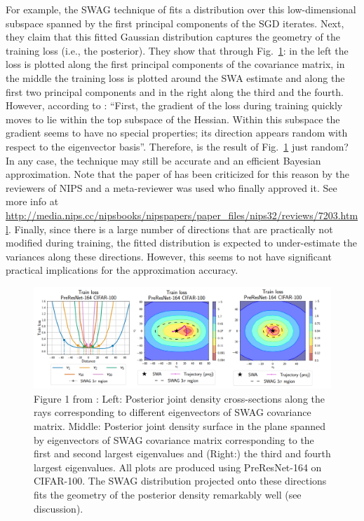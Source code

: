 For example, the SWAG technique of \textcite{maddox2019simple} fits a distribution over this low-dimensional subspace spanned by the first principal components of the SGD iterates.
Next, they claim that this fitted Gaussian distribution captures the geometry of the training loss (i.e., the posterior). 
They show that through Fig.~\ref{swaggeometry}: in the left the loss is plotted along the first principal components of the covariance matrix, in the middle the training loss is plotted around the SWA estimate and along the first two principal components and in the right along the third and the fourth. 
However, according to \textcite{gur-ari2018gradient}: ``First, the gradient of the loss during training quickly moves to lie within the top subspace of the Hessian. Within this subspace the gradient seems to have no special properties; its direction appears random with respect to the eigenvector basis''.
Therefore, is the result of Fig.~\ref{swaggeometry} just random?
In any case, the technique may still be accurate and an efficient Bayesian approximation. 
Note that the paper of \textcite{maddox2019simple} has been criticized for this reason by the reviewers of NIPS and a meta-reviewer was used who finally approved it. 
See more info at \url{http://media.nips.cc/nipsbooks/nipspapers/paper_files/nips32/reviews/7203.html}.
Finally, since there is a large number of directions that are practically not modified during training, the fitted distribution is expected to under-estimate the variances along these directions. 
However, this seems to not have significant practical implications for the approximation accuracy. 
\begin{figure}[H]
	\centering
	\includegraphics[width=1\linewidth]{./Figures/swaggeometry.png}
	\caption{Figure 1 from \textcite{maddox2019simple}:  Left: Posterior joint density cross-sections along the rays corresponding to different eigenvectors of SWAG covariance matrix. Middle: Posterior joint density surface in the plane spanned by eigenvectors of SWAG covariance matrix corresponding to the first and second largest eigenvalues and (Right:) the third and fourth largest eigenvalues. All plots are produced using PreResNet-164 on CIFAR-100. The SWAG distribution projected onto these directions fits the geometry of the posterior density remarkably well (see discussion).
}
	\label{swaggeometry}
\end{figure} 

